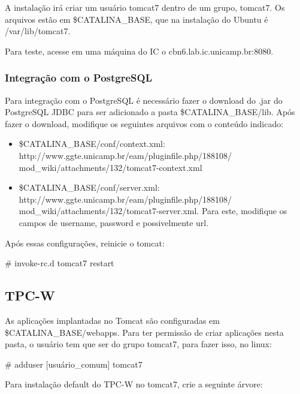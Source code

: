 \documentclass[a4paper,10pt]{article}
\begin{document}
        A instalação irá criar um usuário tomcat7 dentro de um grupo, tomcat7. Os arquivos estão em \$CATALINA\_BASE, que na instalação do Ubuntu é /var/lib/tomcat7.

        Para teste, acesse em uma máquina do IC o cbn6.lab.ic.unicamp.br:8080.

        \subsubsection{Integração com o PostgreSQL}
        Para integração com o PostgreSQL é necessário fazer o download do .jar do PostgreSQL JDBC para ser adicionado a pasta \$CATALINA\_BASE/lib. Após fazer o download, modifique os seguintes arquivos com o conteúdo indicado:

        \begin{itemize}
        \setlength{\itemindent}{-.0in}
            \item \$CATALINA\_BASE/conf/context.xml: http://www.ggte.unicamp.br/eam/pluginfile.php/188108/
            mod\_wiki/attachments/132/tomcat7-context.xml
            \item \$CATALINA\_BASE/conf/server.xml: http://www.ggte.unicamp.br/eam/pluginfile.php/188108/
            mod\_wiki/attachments/132/tomcat7-server.xml. Para este, modifique os campos de username, password e possivelmente url.
        \end{itemize}

        Após essas configurações, reinicie o tomcat:

        \begin{spverbatim}
        # invoke-rc.d tomcat7 restart
        \end{spverbatim}

        \subsection{TPC-W}

        As aplicações implantadas no Tomcat são configuradas em \$CATALINA\_BASE/webapps. Para ter permissão de criar aplicações nesta pasta, o usuário tem que ser do grupo tomcat7, para fazer isso, no linux:

        \begin{spverbatim}
            # adduser [usuário_comum] tomcat7
        \end{spverbatim}

        Para instalação default do TPC-W no tomcat7, crie a seguinte árvore:
\end{document}
